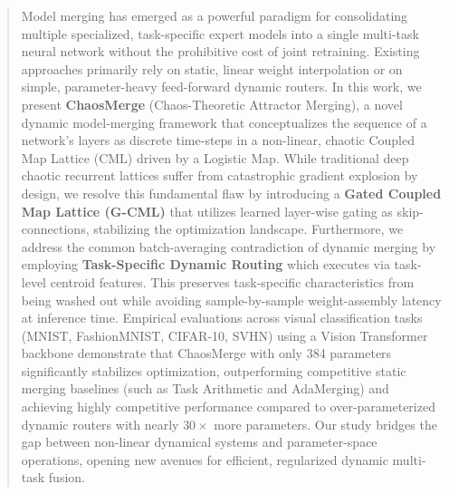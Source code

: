 \begin{abstract}
Model merging has emerged as a powerful paradigm for consolidating multiple specialized, task-specific expert models into a single multi-task neural network without the prohibitive cost of joint retraining. Existing approaches primarily rely on static, linear weight interpolation or on simple, parameter-heavy feed-forward dynamic routers. In this work, we present \textbf{ChaosMerge} (Chaos-Theoretic Attractor Merging), a novel dynamic model-merging framework that conceptualizes the sequence of a network's layers as discrete time-steps in a non-linear, chaotic Coupled Map Lattice (CML) driven by a Logistic Map. 
While traditional deep chaotic recurrent lattices suffer from catastrophic gradient explosion by design, we resolve this fundamental flaw by introducing a \textbf{Gated Coupled Map Lattice (G-CML)} that utilizes learned layer-wise gating as skip-connections, stabilizing the optimization landscape. Furthermore, we address the common batch-averaging contradiction of dynamic merging by employing \textbf{Task-Specific Dynamic Routing} which executes via task-level centroid features. This preserves task-specific characteristics from being washed out while avoiding sample-by-sample weight-assembly latency at inference time.
Empirical evaluations across visual classification tasks (MNIST, FashionMNIST, CIFAR-10, SVHN) using a Vision Transformer backbone demonstrate that ChaosMerge with only 384 parameters significantly stabilizes optimization, outperforming competitive static merging baselines (such as Task Arithmetic and AdaMerging) and achieving highly competitive performance compared to over-parameterized dynamic routers with nearly $30\times$ more parameters. Our study bridges the gap between non-linear dynamical systems and parameter-space operations, opening new avenues for efficient, regularized dynamic multi-task fusion.
\end{abstract}
